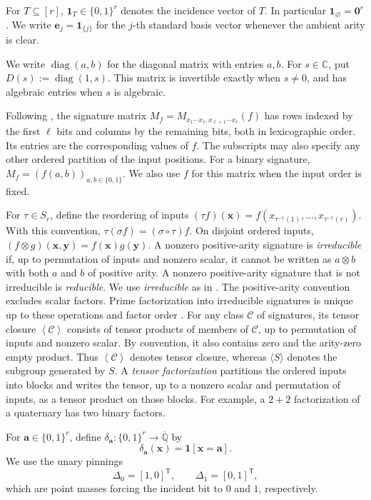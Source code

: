 \documentclass[11pt,letterpaper,onecolumn]{article}
\theoremstyle{plain}
\theoremstyle{definition}
\theoremstyle{remark}
\newcommand{\AlgNums}{\overline{\mathbb Q}}
\newcommand{\cC}{\mathscr C}
\newcommand{\angles}[1]{\left\langle #1\right\rangle}
\newcommand{\diag}{\operatorname{diag}}
\newcommand{\one}{\mathbf 1}
\newcommand{\zero}{\mathbf 0}
\newcommand{\DeltaZero}{\Delta_0}
\newcommand{\DeltaOne}{\Delta_1}
\begin{document}
For \(T\subseteq[r]\), \(\one_T\in\{0,1\}^r\) denotes the incidence
vector of \(T\). In particular \(\one_\varnothing=\zero^r\).  We write
\({\mathbf{e}}_j=\one_{\{j\}}\) for the \(j\)-th standard basis vector whenever the
ambient arity is clear.

We write \(\diag(a,b)\) for the diagonal matrix with entries \(a,b\).
For \(s\in\mathbb C\), put \(D(s):=\diag(1,s)\). This matrix is
invertible exactly when \(s\ne0\), and has algebraic entries when \(s\) is algebraic.

Following \cite[Section~2.3.1]{MengWangXiaZheng2025}, the signature
matrix \(M_f=M_{x_1\cdots x_\ell,x_{\ell+1}\cdots x_r}(f)\) has
rows indexed by the first \(\ell\) bits and columns by the remaining
bits, both in lexicographic order.  Its entries are the corresponding
values of \(f\). The subscripts may also specify any other ordered partition of the input positions. For a binary signature,
\(M_f=(f(a,b))_{a,b\in\{0,1\}}\). We also use \(f\) for this matrix
when the input order is fixed.

For \(\tau\in S_r\), define the reordering of inputs
\((\tau f)({\mathbf{x}})=f(x_{\tau^{-1}(1)},\ldots,x_{\tau^{-1}(r)})\).
With this convention, \(\tau(\sigma f)=(\sigma\circ\tau)f\).
On disjoint ordered inputs, \((f\otimes g)({\mathbf{x}},{\mathbf{y}})=f({\mathbf{x}})g({\mathbf{y}})\).
A nonzero positive-arity signature is \emph{irreducible} if, up to permutation of inputs and nonzero scalar, it cannot
be written as \(a\otimes b\) with both \(a\) and \(b\) of positive arity.
A nonzero positive-arity signature that is not irreducible is
\emph{reducible}. We use \emph{irreducible} as in
\cite[Section~2.3.4]{MengWangXiaZheng2025}. The positive-arity convention
excludes scalar factors.  Prime factorization into irreducible signatures is
unique up to these operations and factor order
\cite[Lemma~16]{MengWangXiaZheng2025}.  For any class \(\cC\) of
signatures, its tensor closure \(\angles{\cC}\) consists of tensor products
of members of \(\cC\), up to permutation of inputs and nonzero scalar.  By
convention, it also contains zero and the arity-zero empty product.
Thus \(\angles{\cC}\) denotes tensor closure, whereas \(\langle S\rangle\)
denotes the subgroup generated by \(S\).
A \emph{tensor factorization} partitions the ordered inputs into blocks and
writes the tensor, up to a nonzero scalar and permutation of inputs, as
a tensor product on those blocks.  For example, a \(2+2\) factorization of a quaternary has two binary
factors.

For \({\mathbf{a}}\in\{0,1\}^r\), define \(\delta_{\mathbf{a}}:\{0,1\}^r\to\AlgNums\) by
\[
  \delta_{\mathbf{a}}({\mathbf{x}})=\one[{\mathbf{x}}={\mathbf{a}}].
\]
We use the unary pinnings
\[
  \DeltaZero=[1,0]^{\mathsf T},
  \qquad
  \DeltaOne=[0,1]^{\mathsf T},
\]
which are point masses forcing the incident bit to \(0\) and \(1\),
respectively.  
\end{document}
